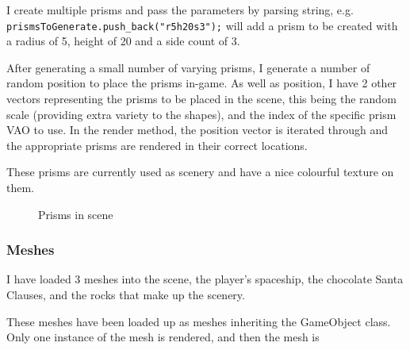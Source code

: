 \documentclass[11pt]{report}
\begin{document}
I create multiple prisms and pass the parameters by parsing string, e.g.\\ \colorbox{mygrey}{\lstinline{prismsToGenerate.push_back("r5h20s3");}} will add a prism to be created with a radius of 5, height of 20 and a side count of 3. 

After generating a small number of varying prisms, I generate a number of random position to place the prisms in-game. As well as position, I have 2 other vectors representing the prisms to be placed in the scene, this being the random scale (providing extra variety to the shapes), and the index of the specific prism VAO to use. In the render method, the position vector is iterated through and the appropriate prisms are rendered in their correct locations.

These prisms are currently used as scenery and have a nice colourful texture on them. 
\begin{figure}[H]
    \centering
    \caption{Prisms in scene}
\end{figure}

\subsubsection*{Meshes}
I have loaded 3 meshes into the scene, the player's spaceship, the chocolate Santa Clauses, and the rocks that make up the scenery.

These meshes have been loaded up as meshes inheriting the GameObject class. Only one instance of the mesh is rendered, and then the mesh is 
\end{document}
